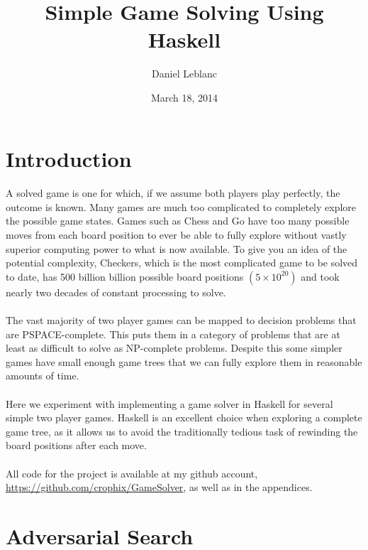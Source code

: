 \documentclass[10pt]{article}
\title{\bf Simple Game Solving Using Haskell}
\author{Daniel Leblanc}
\date{March 18, 2014}
\begin{document}
\maketitle

\section{Introduction}
\paragraph{} A solved game is one for which, if we assume both players play perfectly,
    the outcome is known.  Many games are much too complicated to completely explore
    the possible game states.  Games such as Chess and Go have too many 
    possible moves from each board position to ever be able to fully explore without 
    vastly superior computing power to what is now available.  To give you an idea 
    of the potential complexity, Checkers, which is the most complicated game to be
    solved to date, has 500 billion billion possible board positions $(5 \times 10^{20})$
    \cite{checkersSolved} and took nearly two decades of constant processing to solve. 
\paragraph{} The vast majority of
    two player games can be mapped to decision problems that are PSPACE-complete.  This
    puts them in a category of problems that are at least as difficult to solve as 
    NP-complete problems.  Despite this some simpler games have small enough game trees
    that we can fully explore them in reasonable amounts of time.
\paragraph{} Here we experiment with implementing a game solver in Haskell for several 
    simple two player games.  Haskell is an excellent choice when exploring a complete 
    game tree, as it allows us to avoid the traditionally tedious task of rewinding 
    the board positions after each move.
\paragraph{} All code for the project is available at my github account, 
    \url{https://github.com/crophix/GameSolver}, as well as in the appendices.

\section{Adversarial Search}
\end{document}
